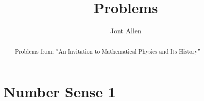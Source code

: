 \documentclass{xourse}
\title{Problems}
\author{Jont Allen}
\begin{document}
\begin{abstract}
Problems from: ``An Invitation to Mathematical Physics
and Its History''
\end{abstract}
\maketitle

\part{Number Sense 1}

\end{document}
